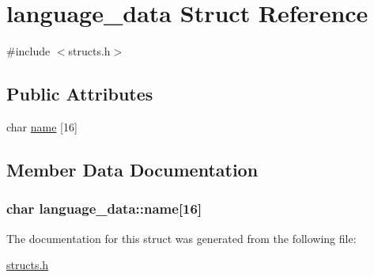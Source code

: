 \hypertarget{structlanguage__data}{\section{language\-\_\-data Struct Reference}
\label{structlanguage__data}
}


{\ttfamily \#include $<$structs.\-h$>$}

\subsection*{Public Attributes}
\begin{DoxyCompactItemize}
\item 
char \hyperlink{structlanguage__data_a4addd6b17066b256e8d486053fa48a4e}{name} \mbox{[}16\mbox{]}
\end{DoxyCompactItemize}


\subsection{Member Data Documentation}
\hypertarget{structlanguage__data_a4addd6b17066b256e8d486053fa48a4e}{
\subsubsection[{name}]{\setlength{\rightskip}{0pt plus 5cm}char language\-\_\-data\-::name\mbox{[}16\mbox{]}}}\label{structlanguage__data_a4addd6b17066b256e8d486053fa48a4e}


The documentation for this struct was generated from the following file\-:\begin{DoxyCompactItemize}
\item 
\hyperlink{structs_8h}{structs.\-h}\end{DoxyCompactItemize}
